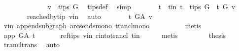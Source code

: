\begin{isabellebody}
\isanewline
\ \ \ \ \isamarkupfalse%
\ {}\isanewline
\ \ \ \ \isamarkupfalse%
\ \isamarkupfalse%
\ {\isachardoublequoteopen}v\ {\isasymnotin}\ tips\ G{\isachardoublequoteclose}\ \isamarkupfalse%
\ tips{\isacharunderscore}{\kern0pt}def\ \isamarkupfalse%
\ simp\isanewline
\ \ \ \ \isamarkupfalse%
\ \isamarkupfalse%
\ t\ \ t{\isacharunderscore}{\kern0pt}in{\isacharcolon}{\kern0pt}\ {\isachardoublequoteopen}t\ {\isasymin}\ tips\ G\ {\isasymand}\ t\ {\isasymrightarrow}\isactrlsup {\isacharplus}{\kern0pt}\isactrlbsub G\isactrlesub \ v{\isachardoublequoteclose}\ \isanewline
\ \ \ \ \ \ \isamarkupfalse%
\ reached{\isacharunderscore}{\kern0pt}by{\isacharunderscore}{\kern0pt}tip\ v{\isacharunderscore}{\kern0pt}in\ \isamarkupfalse%
\ auto\isanewline
\ \ \ \ \isamarkupfalse%
\ \isamarkupfalse%
\ {\isachardoublequoteopen}t\ {\isasymrightarrow}\isactrlsup {\isacharplus}{\kern0pt}\isactrlbsub G{\isacharunderscore}{\kern0pt}A\isactrlesub \ v{\isachardoublequoteclose}\ \isamarkupfalse%
\ v{\isacharunderscore}{\kern0pt}in\ append{\isacharunderscore}{\kern0pt}subgraph\ arcs{\isacharunderscore}{\kern0pt}ends{\isacharunderscore}{\kern0pt}mono\ trancl{\isacharunderscore}{\kern0pt}mono\isanewline
\ \ \ \ \ \ \ \ \isamarkupfalse%
\ {\isacharparenleft}{\kern0pt}metis{\isacharparenright}{\kern0pt}\isanewline
\ \ \ \ \isamarkupfalse%
\ \isamarkupfalse%
\ {\isachardoublequoteopen}app\ {\isasymrightarrow}\isactrlsup {\isacharplus}{\kern0pt}\isactrlbsub G{\isacharunderscore}{\kern0pt}A\isactrlesub \ t{\isachardoublequoteclose}\ \isanewline
\ \ \ \ \isamarkupfalse%
\ ref{\isacharunderscore}{\kern0pt}tips\ v{\isacharunderscore}{\kern0pt}in\ r{\isacharunderscore}{\kern0pt}into{\isacharunderscore}{\kern0pt}trancl{\isacharprime}{\kern0pt}\ t{\isacharunderscore}{\kern0pt}in\isanewline
\ \ \ \ \isamarkupfalse%
\ {\isacharparenleft}{\kern0pt}metis{\isacharparenright}{\kern0pt}\ \isanewline
\ \ \ \ \isamarkupfalse%
\ \isamarkupfalse%
\ {\isacharquery}{\kern0pt}thesis\ \isamarkupfalse%
\ trancl{\isacharunderscore}{\kern0pt}trans\ \isamarkupfalse%
\ auto\ \isanewline
\ \ \isamarkupfalse%
\isanewline
{}\isamarkupfalse%
%
\endisatagproof
{\isafoldproof}%
%
\isadelimproof
\isanewline

\end{isabellebody}
